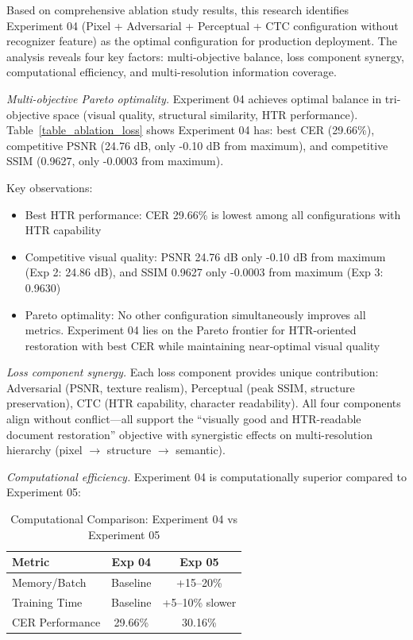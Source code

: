\documentclass[journal]{IEEEtran}
\begin{document}
Based on comprehensive ablation study results, this research identifies Experiment 04 (Pixel + Adversarial + Perceptual + CTC configuration without recognizer feature) as the optimal configuration for production deployment. The analysis reveals four key factors: multi-objective balance, loss component synergy, computational efficiency, and multi-resolution information coverage.

\textit{Multi-objective Pareto optimality.} Experiment 04 achieves optimal balance in tri-objective space (visual quality, structural similarity, HTR performance). Table~\ref{table_ablation_loss} shows Experiment 04 has: best CER (29.66\%), competitive PSNR (24.76 dB, only -0.10 dB from maximum), and competitive SSIM (0.9627, only -0.0003 from maximum).

Key observations:
\begin{itemize}
    \item Best HTR performance: CER 29.66\% is lowest among all configurations with HTR capability
    
    \item Competitive visual quality: PSNR 24.76 dB only -0.10 dB from maximum (Exp 2: 24.86 dB), and SSIM 0.9627 only -0.0003 from maximum (Exp 3: 0.9630)
    
    \item Pareto optimality: No other configuration simultaneously improves all metrics. Experiment 04 lies on the Pareto frontier for HTR-oriented restoration with best CER while maintaining near-optimal visual quality
\end{itemize}

\textit{Loss component synergy.} Each loss component provides unique contribution: Adversarial (PSNR, texture realism), Perceptual (peak SSIM, structure preservation), CTC (HTR capability, character readability). All four components align without conflict—all support the ``visually good and HTR-readable document restoration'' objective with synergistic effects on multi-resolution hierarchy (pixel $\rightarrow$ structure $\rightarrow$ semantic).

\textit{Computational efficiency.} Experiment 04 is computationally superior compared to Experiment 05:

\begin{table}[!t]
\centering
\footnotesize
\caption{Computational Comparison: Experiment 04 vs Experiment 05}
\label{table_exp04_computational}
\begin{tabular}{lcc}
\hline
\textbf{Metric} & \textbf{Exp 04} & \textbf{Exp 05} \\
\hline
Memory/Batch & Baseline & +15--20\% \\
Training Time & Baseline & +5--10\% slower \\
CER Performance & 29.66\% & 30.16\% \\
\hline
\end{tabular}
\end{table}
\end{document}
